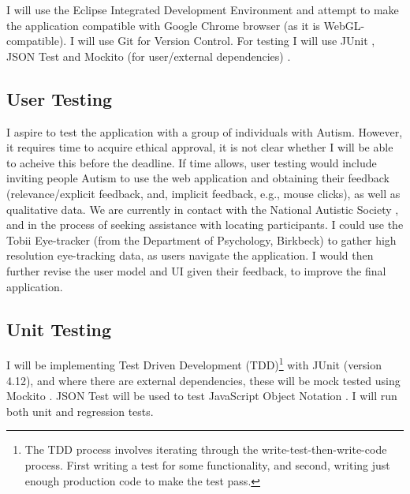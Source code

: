 \documentclass[a4paper, 11pt]{article}
\begin{document}
\begin{justify}
I will use the Eclipse Integrated Development Environment and attempt to make the application compatible with Google Chrome browser (as it is WebGL-compatible). I will use Git for Version Control. For testing I will use JUnit \cite{junit}, JSON Test \cite{jsontest} and Mockito (for user/external dependencies) \cite{mockito}.

\subsection{User Testing}
I aspire to test the application with a group of individuals with Autism. However, it requires time to acquire ethical approval, it is not clear whether I will be able to acheive this before the deadline. If time allows, user testing would include inviting people Autism to use the web application and obtaining their feedback (relevance/explicit feedback, and, implicit feedback, e.g., mouse clicks), as well as qualitative data. We are currently in contact with the National Autistic Society \cite{nas}, and in the process of seeking assistance with locating participants. I could use the Tobii Eye-tracker (from the Department of Psychology, Birkbeck) to gather high resolution eye-tracking data, as users navigate the application. I would then further revise the user model and UI given their feedback, to improve the final application.

\subsection{Unit Testing}
I will be implementing Test Driven Development (TDD)\footnote{The TDD process involves iterating through the write-test-then-write-code process. First writing a test for some functionality, and second, writing just enough production code to make the test pass.} with JUnit (version 4.12), and where there are external dependencies, these will be mock tested using Mockito \cite{mockito}. JSON Test will be used to test JavaScript Object Notation \cite{jsontest}. I will run both unit and regression tests.


\end{justify}
\end{document}
